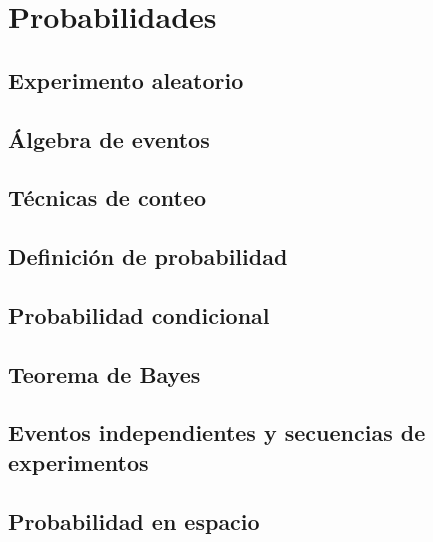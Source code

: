 \documentclass[10pt,]{krantz}
\theoremstyle{definition}
\theoremstyle{definition}
\theoremstyle{definition}
\theoremstyle{remark}
\begin{document}
\hypertarget{part-probabilidades}{%
\part{Probabilidades}\label{part-probabilidades}}

\hypertarget{experimento-aleatorio}{%
\chapter{Experimento aleatorio}\label{experimento-aleatorio}}

\hypertarget{uxe1lgebra-de-eventos}{%
\chapter{Álgebra de eventos}\label{uxe1lgebra-de-eventos}}

\hypertarget{tuxe9cnicas-de-conteo}{%
\chapter{Técnicas de conteo}\label{tuxe9cnicas-de-conteo}}

\hypertarget{definiciuxf3n-de-probabilidad}{%
\chapter{Definición de probabilidad}\label{definiciuxf3n-de-probabilidad}}

\hypertarget{probabilidad-condicional}{%
\chapter{Probabilidad condicional}\label{probabilidad-condicional}}

\hypertarget{teorema-de-bayes}{%
\chapter{Teorema de Bayes}\label{teorema-de-bayes}}

\hypertarget{eventos-independientes-y-secuencias-de-experimentos}{%
\chapter{Eventos independientes y secuencias de experimentos}\label{eventos-independientes-y-secuencias-de-experimentos}}

\hypertarget{probabilidad-en-espacio}{%
\chapter{Probabilidad en espacio}\label{probabilidad-en-espacio}}
\end{document}
